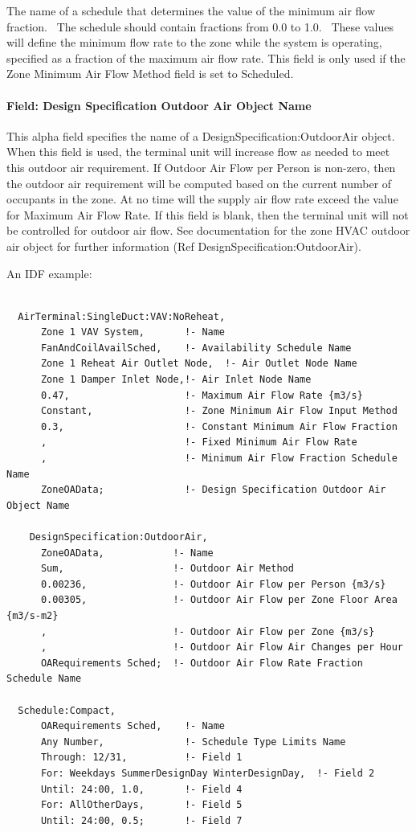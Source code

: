 The name of a schedule that determines the value of the minimum air flow fraction.~ The schedule should contain fractions from 0.0 to 1.0.~ These values will define the minimum flow rate to the zone while the system is operating, specified as a fraction of the maximum air flow rate. This field is only used if the Zone Minimum Air Flow Method field is set to Scheduled.

\paragraph{Field: Design Specification Outdoor Air Object Name}\label{field-design-specification-outdoor-air-object-name-1}

This alpha field specifies the name of a DesignSpecification:OutdoorAir object. When this field is used, the terminal unit will increase flow as needed to meet this outdoor air requirement. If Outdoor Air Flow per Person is non-zero, then the outdoor air requirement will be computed based on the current number of occupants in the zone. At no time will the supply air flow rate exceed the value for Maximum Air Flow Rate. If this field is blank, then the terminal unit will not be controlled for outdoor air flow. See documentation for the zone HVAC outdoor air object for further information (Ref DesignSpecification:OutdoorAir).

An IDF example:

\begin{lstlisting}

  AirTerminal:SingleDuct:VAV:NoReheat,
      Zone 1 VAV System,       !- Name
      FanAndCoilAvailSched,    !- Availability Schedule Name
      Zone 1 Reheat Air Outlet Node,  !- Air Outlet Node Name
      Zone 1 Damper Inlet Node,!- Air Inlet Node Name
      0.47,                    !- Maximum Air Flow Rate {m3/s}
      Constant,                !- Zone Minimum Air Flow Input Method
      0.3,                     !- Constant Minimum Air Flow Fraction
      ,                        !- Fixed Minimum Air Flow Rate
      ,                        !- Minimum Air Flow Fraction Schedule Name
      ZoneOAData;              !- Design Specification Outdoor Air Object Name

    DesignSpecification:OutdoorAir,
      ZoneOAData,            !- Name
      Sum,                   !- Outdoor Air Method
      0.00236,               !- Outdoor Air Flow per Person {m3/s}
      0.00305,               !- Outdoor Air Flow per Zone Floor Area {m3/s-m2}
      ,                      !- Outdoor Air Flow per Zone {m3/s}
      ,                      !- Outdoor Air Flow Air Changes per Hour
      OARequirements Sched;  !- Outdoor Air Flow Rate Fraction Schedule Name

  Schedule:Compact,
      OARequirements Sched,    !- Name
      Any Number,              !- Schedule Type Limits Name
      Through: 12/31,          !- Field 1
      For: Weekdays SummerDesignDay WinterDesignDay,  !- Field 2
      Until: 24:00, 1.0,       !- Field 4
      For: AllOtherDays,       !- Field 5
      Until: 24:00, 0.5;       !- Field 7
\end{lstlisting}


